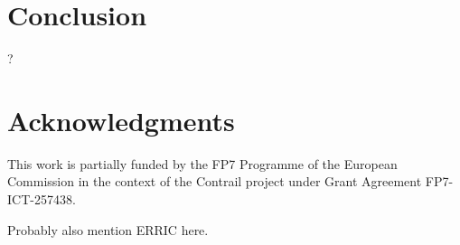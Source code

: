 \documentclass[10pt,twocolumn]{article}
\begin{document}
\section*{Conclusion}


?


\section*{Acknowledgments}

This work is partially funded by the FP7 Programme of the European
Commission in the context of the Contrail project under Grant
Agreement FP7-ICT-257438.

Probably also mention ERRIC here.




\end{document}
